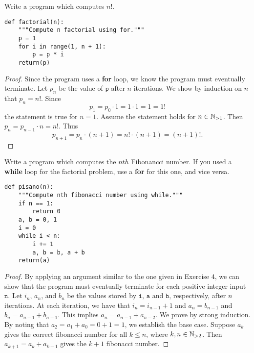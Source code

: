 \documentclass[10pt,twoside]{amsart}
\begin{document}
\begin{exercises}
    \begin{exercise}Write a program which computes $n!$.
        \end{exercise}

        
    \begin{minipage}{\textwidth}
        \begin{lstlisting}
def factorial(n):
    """Compute n factorial using for."""
    p = 1
    for i in range(1, n + 1):
        p = p * i
    return(p)
        \end{lstlisting}
    \end{minipage}

 
            \begin{proof}Since the program uses a \textbf{for} loop, we know the program must eventually terminate. Let $p_n$ be the value of $\texttt{p}$ after $n$ iterations. We show by induction on $n$ that $p_n=n!$. Since 
                \[p_1=p_0 \cdot 1= 1 \cdot 1= 1 = 1!\] 
                the statement is true for $n=1$. Assume the statement holds for $n \in \mathbb{N}_{>1}$. Then $p_{n} = p_{n-1} \cdot n = n!$. Thus
                \[p_{n+1}=p_n \cdot (n+1) = n! \cdot (n+1) = (n+1)!.\]
            \end{proof}

    
    \begin{exercise}Write a program which computes the $nth$ Fibonancci number. If you used a \textbf{while} loop for the factorial problem, use a \textbf{for} for this one, and vice versa.
        \end{exercise}


\begin{minipage}{\textwidth}
\begin{lstlisting}
def pisano(n):
    """Compute nth fibonacci number using while."""
    if n == 1:
        return 0
    a, b = 0, 1
    i = 0
    while i < n:
        i += 1
        a, b = b, a + b
    return(a)
        \end{lstlisting}
\end{minipage}



            \begin{proof}By applying an argument similar to the one given in Exercise $4$, we can show that the program must eventually terminate for each positive integer input $\texttt{n}$. Let $i_n$, $a_n$, and $b_n$ be the values stored by $\texttt{i}$, $\texttt{a}$ and $\texttt{b}$, respectively, after $n$ iterations. At each iteration, we have that $i_n=i_{n-1}+1$ and $a_{n}=b_{n-1}$ and $b_n=a_{n-1}+b_{n-1}$. This implies $a_n=a_{n-1}+a_{n-2}$. We prove by strong induction. By noting that $a_2=a_1+a_0=0+1=1$, we establish the base case. Suppose $a_k$ gives the correct fibonacci number for all $k \leq n$, where $k,n \in \mathbb{N}_{>2}$. Then $a_{k+1}=a_{k}+a_{k-1}$ gives the $k+1$ fibonacci number.
            \end{proof}



\end{exercises}
\end{document}

